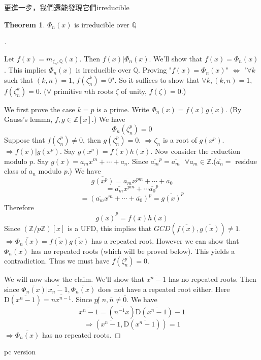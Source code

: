 \documentclass{article}
\newcommand{\sfa}{\text{  } \forall}
\theoremstyle{definition}
\newtheorem{thm}{Theorem}
\newenvironment{proofs}[1][\proofname]{%
  \begin{proof}[#1]$ $\par\nobreak\ignorespaces
}{%
  \end{proof}
}
\begin{document}
更進一步，我們還能發現它們irreducible

\begin{thm}
	$\Phi_n(x)$ is irreducible over $\mathbb{Q}$
\end{thm}

\begin{proofs}
	Let $f(x) = m_{\zeta_n, \mathbb{Q}}(x)$.
	Then $f(x) | \Phi_n(x)$.
	We'll show that $f(x) = \Phi_n(x)$.
	This implies $\Phi_n(x)$ is irreducible over $\mathbb{Q}$.
	Proving "$f(x) = \Phi_n(x)$" $\Leftrightarrow$ "$\forall k$ such that $(k, n) = 1$, $f(\zeta_n^k) = 0$".
	So it suffices to show that $\forall k, (k, n) = 1$, $f(\zeta_n^k) = 0$. ($\forall $ primitive $n$th roots $\zeta$ of unity, $f(\zeta) = 0$.)
	\par We first prove the case $k = p$ is a prime.
	Write $\Phi_n(x) = f(x) g(x)$. (By Gauss's lemma, $f, g \in \mathbb{Z}[x]$.)
	We have
	\[
		\Phi_n(\zeta_n^p) = 0
	\]
	Suppose that $f(\zeta_n^p) \neq 0$, then $g(\zeta_n^p) = 0$.
	$\Rightarrow \zeta_n$ is a root of $g(x^p)$.
	$\Rightarrow f(x) | g(x^p)$.
	Say $g(x^p) = f(x) h(x)$.
	Now consider the reduction modulo $p$.
	Say $g(x) = a_m x^m + \cdots + a_n$.
	Since $\overline{a_m}^p = \overline{a_m} \sfa a_m \in \mathbb{Z}$.($\overline{a_n} = $ residue class of $a_n$ modulo $p$.)
	We have
	\[
		\overline{g(x^p)} = \overline{a_m} x^{pm} + \cdots + \overline{a_0}
	\]
	\[
		= \overline{a_m} x^{pm} + \cdots \overline{a_0}^p
	\]
	\[
		= (\overline{a_m} x^m + \cdots + \overline{a_0})^p = \overline{g(x)}^p
	\]
	Therefore
	\[
		\overline{g(x)}^p = \overline{f(x)}\overline{h(x)}
	\]
	Since $(\mathbb{Z}/p \mathbb{Z})[x]$ is a UFD, this implies that $GCD(\overline{f(x)}, \overline{g(x)}) \neq 1$.
	$\Rightarrow \overline{\Phi_n(x)} = \overline{f(x)} \overline{g(x)}$ has a repeated root.
	However we can show that $\overline{\Phi_n(x)}$ has no repeated roots (which will be proved below).
	This yields a contradiction.
	Thus we must have $f(\zeta_n^p) = 0$.
	\par We will now show the claim.
	We'll show that $\overline{x^n - 1}$ has no repeated roots.
	Then since $\overline{\Phi_n(x)} | \overline{x_n - 1}, \overline{\Phi_n(x)}$ does not have a repeated root either.
	Here $\mathrm{D}(\overline{x^n - 1}) = \overline{n x^{n - 1}}$.
	Since $p \not| \; n, \bar{n} \neq \bar{0}$.
	We have
	\[
		\overline{x^n - 1} = (\overline{n^{-1}x}) \mathrm{D}(\overline{x^n - 1}) - 1
	\]
	\[
		\Rightarrow (\overline{x^n - 1}, \mathrm{D}(\overline{x^n - 1})) = 1
	\]
	$\Rightarrow \overline{\Phi_n(x)}$ has no repeated roots.
\end{proofs}

pc version
\end{document}
